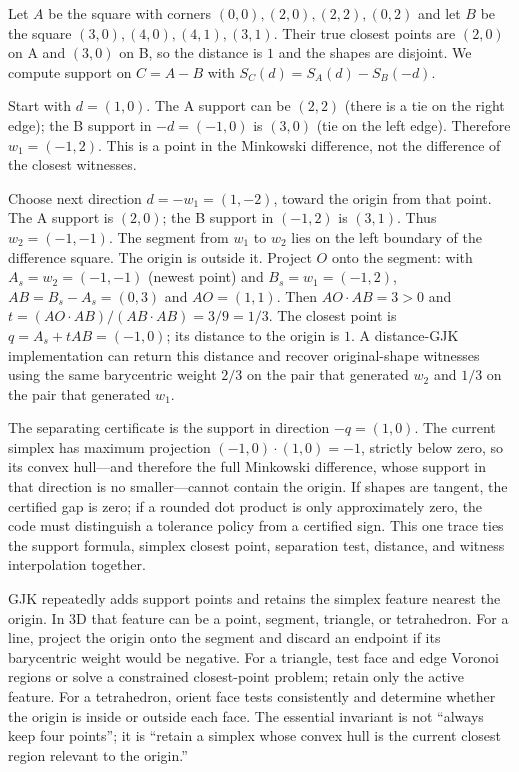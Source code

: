 \hypertarget{03-visual-computing-i-ch020-numeric-witness-a-complete-2d-gjk-separation-trace}{}

Let \(A\) be the square with corners \((0,0),(2,0),(2,2),(0,2)\) and let \(B\) be the square \((3,0),(4,0),(4,1),(3,1)\). Their true closest points are \((2,0)\) on A and \((3,0)\) on B, so the distance is \(1\) and the shapes are disjoint. We compute support on \(C=A-B\) with \(S_C(d)=S_A(d)-S_B(-d)\).

Start with \(d=(1,0)\). The A support can be \((2,2)\) (there is a tie on the right edge); the B support in \(-d=(-1,0)\) is \((3,0)\) (tie on the left edge). Therefore \(w_1=(-1,2)\). This is a point in the Minkowski difference, not the difference of the closest witnesses.

Choose next direction \(d=-w_1=(1,-2)\), toward the origin from that point. The A support is \((2,0)\); the B support in \((-1,2)\) is \((3,1)\). Thus \(w_2=(-1,-1)\). The segment from \(w_1\) to \(w_2\) lies on the left boundary of the difference square. The origin is outside it. Project \(O\) onto the segment: with \(A_s=w_2=(-1,-1)\) (newest point) and \(B_s=w_1=(-1,2)\), \(AB=B_s-A_s=(0,3)\) and \(AO=(1,1)\). Then \(AO\cdot AB=3>0\) and \(t=(AO\cdot AB)/(AB\cdot AB)=3/9=1/3\). The closest point is \(q=A_s+tAB=(-1,0)\); its distance to the origin is \(1\). A distance-GJK implementation can return this distance and recover original-shape witnesses using the same barycentric weight \(2/3\) on the pair that generated \(w_2\) and \(1/3\) on the pair that generated \(w_1\).

The separating certificate is the support in direction \(-q=(1,0)\). The current simplex has maximum projection \((-1,0)\cdot(1,0)=-1\), strictly below zero, so its convex hull---and therefore the full Minkowski difference, whose support in that direction is no smaller---cannot contain the origin. If shapes are tangent, the certified gap is zero; if a rounded dot product is only approximately zero, the code must distinguish a tolerance policy from a certified sign. This one trace ties the support formula, simplex closest point, separation test, distance, and witness interpolation together.

GJK repeatedly adds support points and retains the simplex feature nearest the origin. In 3D that feature can be a point, segment, triangle, or tetrahedron. For a line, project the origin onto the segment and discard an endpoint if its barycentric weight would be negative. For a triangle, test face and edge Voronoi regions or solve a constrained closest-point problem; retain only the active feature. For a tetrahedron, orient face tests consistently and determine whether the origin is inside or outside each face. The essential invariant is not ``always keep four points''; it is ``retain a simplex whose convex hull is the current closest region relevant to the origin.''

